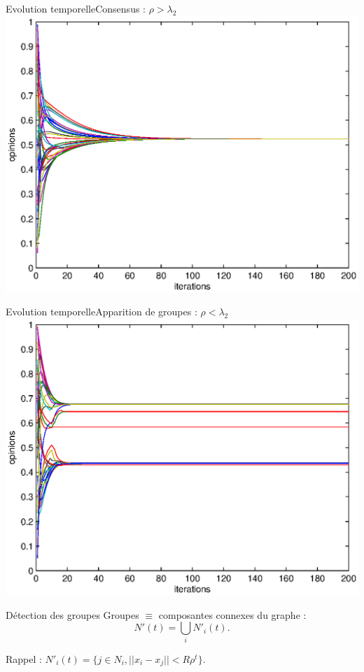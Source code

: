 \documentclass{beamer}
\begin{document}
\begin{frame}{Evolution temporelle}{Consensus : $\rho > \lambda_2$} 
	\includegraphics[width=\textwidth]{evolution_ok}
\end{frame}
\begin{frame}{Evolution temporelle}{Apparition de groupes : $\rho < \lambda_2$}
	\includegraphics[width=\textwidth]{evolution_clusters}
\end{frame}

\begin{frame}{Détection des groupes}
	Groupes $\equiv$ composantes connexes du graphe :
	$$N'(t)=\bigcup_i N'_i(t).$$

	Rappel : $N'_i(t) = \{j \in N_i, ||x_i - x_j|| < R \rho^t\}.$
\end{frame}
\end{document}
